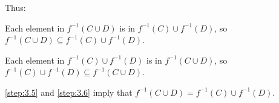 \begin{answer}
  \step
  Thus:
  \begin{enumarabic}
    \item Each element in $f^{-1}(C \cup D)$ is in $f^{-1}(C) \cup f^{-1}(D)$,
      so $f^{-1}(C \cup D) \subseteq f^{-1}(C) \cup f^{-1}(D)$.~\label{step:3.5}
    \item Each element in $f^{-1}(C) \cup f^{-1}(D)$ is in $f^{-1}(C \cup D)$,
      so $f^{-1}(C) \cup f^{-1}(D) \subseteq f^{-1}(C \cup D)$.~\label{step:3.6}
    \item \ref{step:3.5} and \ref{step:3.6} imply that $f^{-1}(C \cup D) = f^{-1}(C) \cup f^{-1}(D)$.
  \end{enumarabic}

\end{answer}
